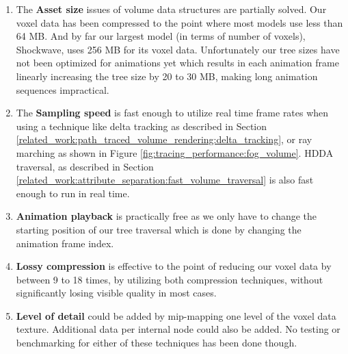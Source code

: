 \begin{enumerate}
    \item The \textbf{Asset size} issues of volume data structures are partially solved. Our voxel data has been compressed to the point where most models use less than 64 MB. And by far our largest model (in terms of number of voxels), Shockwave, uses 256 MB for its voxel data. Unfortunately our tree sizes have not been optimized for animations yet which results in each animation frame linearly increasing the tree size by 20 to 30 MB, making long animation sequences impractical.
    \item The \textbf{Sampling speed} is fast enough to utilize real time frame rates when using a technique like delta tracking as described in Section \ref{related_work:path_traced_volume_rendering:delta_tracking}, or ray marching as shown in Figure \ref{fig:tracing_performance:fog_volume}. HDDA traversal, as described in Section \ref{related_work:attribute_separation:fast_volume_traversal} is also fast enough to run in real time.
    \item \textbf{Animation playback} is practically free as we only have to change the starting position of our tree traversal which is done by changing the animation frame index.
    \item \textbf{Lossy compression} is effective to the point of reducing our voxel data by between 9 to 18 times, by utilizing both compression techniques, without significantly losing visible quality in most cases.
    \item \textbf{Level of detail} could be added by mip-mapping one level of the voxel data texture. Additional data per internal node could also be added. No testing or benchmarking for either of these techniques has been done though.
\end{enumerate}



